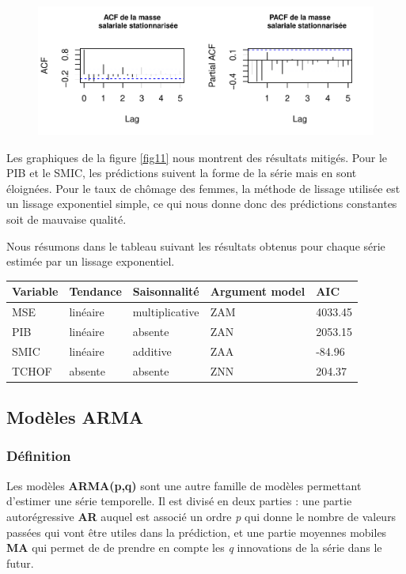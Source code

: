\documentclass[11pt,]{article}
\begin{document}
\begin{figure}

{\centering \includegraphics{doc_files/figure-latex/unnamed-chunk-13-1} 

}

\caption{\label{fig11}}\label{fig:unnamed-chunk-13}
\end{figure}

Les graphiques de la figure \ref{fig11} nous montrent des résultats
mitigés. Pour le PIB et le SMIC, les prédictions suivent la forme de la
série mais en sont éloignées. Pour le taux de chômage des femmes, la
méthode de lissage utilisée est un lissage exponentiel simple, ce qui
nous donne donc des prédictions constantes soit de mauvaise qualité.

Nous résumons dans le tableau suivant les résultats obtenus pour chaque
série estimée par un lissage exponentiel.

\begin{longtable}[]{@{}lllll@{}}
\toprule
Variable & Tendance & Saisonnalité & Argument model & AIC\tabularnewline
\midrule
\endhead
MSE & linéaire & multiplicative & ZAM & 4033.45\tabularnewline
PIB & linéaire & absente & ZAN & 2053.15\tabularnewline
SMIC & linéaire & additive & ZAA & -84.96\tabularnewline
TCHOF & absente & absente & ZNN & 204.37\tabularnewline
\bottomrule
\end{longtable}

\subsection{Modèles ARMA}\label{modeles-arma}

\subsubsection{Définition}\label{definition-1}

Les modèles \textbf{ARMA(p,q)} sont une autre famille de modèles
permettant d'estimer une série temporelle. Il est divisé en deux parties
: une partie autorégressive \textbf{AR} auquel est associé un ordre
\emph{p} qui donne le nombre de valeurs passées qui vont être utiles
dans la prédiction, et une partie moyennes mobiles \textbf{MA} qui
permet de de prendre en compte les \emph{q} innovations de la série dans
le futur.
\end{document}
